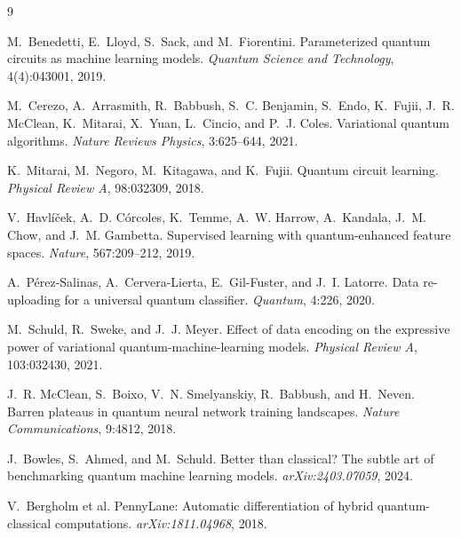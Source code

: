 \documentclass[10pt]{article}
\begin{document}
\begin{thebibliography}{9}
\small

M.~Benedetti, E.~Lloyd, S.~Sack, and M.~Fiorentini.
\newblock Parameterized quantum circuits as machine learning models.
\newblock \emph{Quantum Science and Technology}, 4(4):043001, 2019.

M.~Cerezo, A.~Arrasmith, R.~Babbush, S.~C. Benjamin, S.~Endo, K.~Fujii,
J.~R. McClean, K.~Mitarai, X.~Yuan, L.~Cincio, and P.~J. Coles.
\newblock Variational quantum algorithms.
\newblock \emph{Nature Reviews Physics}, 3:625--644, 2021.

K.~Mitarai, M.~Negoro, M.~Kitagawa, and K.~Fujii.
\newblock Quantum circuit learning.
\newblock \emph{Physical Review A}, 98:032309, 2018.

V.~Havl\'{i}\v{c}ek, A.~D. C\'{o}rcoles, K.~Temme, A.~W. Harrow, A.~Kandala,
J.~M. Chow, and J.~M. Gambetta.
\newblock Supervised learning with quantum-enhanced feature spaces.
\newblock \emph{Nature}, 567:209--212, 2019.

A.~P\'{e}rez-Salinas, A.~Cervera-Lierta, E.~Gil-Fuster, and J.~I. Latorre.
\newblock Data re-uploading for a universal quantum classifier.
\newblock \emph{Quantum}, 4:226, 2020.

M.~Schuld, R.~Sweke, and J.~J. Meyer.
\newblock Effect of data encoding on the expressive power of variational
quantum-machine-learning models.
\newblock \emph{Physical Review A}, 103:032430, 2021.

J.~R. McClean, S.~Boixo, V.~N. Smelyanskiy, R.~Babbush, and H.~Neven.
\newblock Barren plateaus in quantum neural network training landscapes.
\newblock \emph{Nature Communications}, 9:4812, 2018.

J.~Bowles, S.~Ahmed, and M.~Schuld.
\newblock Better than classical? {T}he subtle art of benchmarking quantum
machine learning models.
\newblock \emph{arXiv:2403.07059}, 2024.

V.~Bergholm et al.
\newblock PennyLane: Automatic differentiation of hybrid quantum-classical
computations.
\newblock \emph{arXiv:1811.04968}, 2018.

\end{thebibliography}
\end{document}
